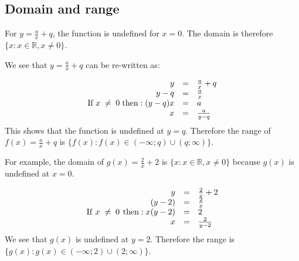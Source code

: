 \subsection*{Domain and range}
\nopagebreak
For $y=\frac{a}{x}+q$, the function is undefined for $x=0$. The domain is therefore $\{x:x\in \mathbb{R},x\ne 0\}$.\par 
We see that $y=\frac{a}{x}+q$ can be re-written as:\par 
\nopagebreak\noindent{}
\begin{equation*}
\begin{array}{ccc}\hfill y& =& \frac{a}{x}+q\hfill \\ \hfill y-q& =& \frac{a}{x}\hfill \\ \hfill \mbox{If}\phantom{\rule{3pt}{0ex}}x\; \ne \;  0 \phantom{\rule{3pt}{0ex}}\mbox{then}:(y-q)x& =& a\hfill \\ \hfill x& =& \frac{a}{y-q}\hfill \end{array}
\end{equation*}
This shows that the function is undefined at $y=q$. Therefore the range of $f(x)=\frac{a}{x}+q$ is $\{f(x):f(x)\in (-\infty ;q)\cup (q;\infty )\}$.\par 
For example, the domain of $g(x)=\frac{2}{x}+2$ is $\{x:x\in \mathbb{R},x\ne 0\}$ because $g(x)$ is undefined at $x=0$.\par 
\nopagebreak\noindent{}
\begin{equation*}
\begin{array}{ccc}\hfill y& =& \frac{2}{x}+2\hfill \\ \hfill (y-2)& =& \frac{2}{x}\hfill \\ \hfill \mbox{If}\phantom{\rule{4pt}{0ex}}x\; \ne \;  0 \phantom{\rule{4pt}{0ex}}\mbox{then}:x(y-2)& =& 2\hfill \\ \hfill x& =& \frac{2}{y-2}\hfill \end{array}
\end{equation*}
We see that $g(x)$ is undefined at $y=2$. Therefore the range is $\{g(x):g(x)\in (-\infty ;2)\cup (2;\infty )\}$.\par 

